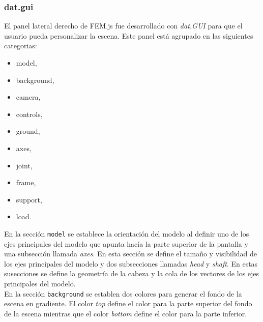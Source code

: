 \subsubsection{dat.gui}
El panel lateral derecho de FEM.js fue desarrollado con \emph{dat.GUI} para que el usuario pueda personalizar la escena. Este panel está agrupado en las siguientes categorias:

\begin{multicols}{2}
  \begin{itemize}
  \item model,
  \item background,
  \item camera,
  \item controls,
  \item ground,
  \item axes,
  \item joint,
  \item frame,
  \item support,
  \item load.
  \end{itemize}
\end{multicols}

En la sección \verb|model| se establece la orientación del modelo al definir uno de los ejes principales del modelo que apunta hacía la parte superior de la pantalla y una subsección llamada \emph{axes}. En esta sección se define el tamaño y visibilidad de los ejes principales del modelo y dos subsecciones llamadas \emph{head} y \emph{shaft}. En estas susecciones se define la geometría de la cabeza y la cola de los vectores de los ejes principales del modelo.\\



En la sección \verb|background| se establen dos colores para generar el fondo de la escena en gradiente. El color \emph{top} define el color para la parte superior del fondo de la escena mientras que el color \emph{bottom} define el color para la parte inferior.\\


